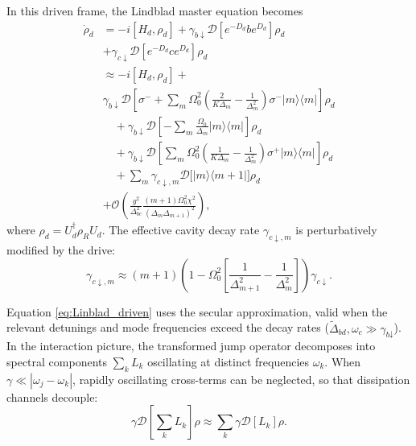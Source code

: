 In this driven frame, the Lindblad master equation becomes
\begin{align}
\label{eq:Linblad_driven}
    \dot{\rho}_d &= -i[H_d, \rho_d] + \gamma_{b\downarrow} \mathcal{D}\left[ e^{-D_d} b e^{D_d} \right] \rho_d \nonumber \\
    &+ \gamma_{c\downarrow} \mathcal{D}\left[ e^{-D_d} c e^{D_d} \right] \rho_d \nonumber \\
    &\approx-i[H_d, \rho_d] +\nonumber \\
    &\gamma_{b\downarrow} \mathcal{D}\left[ \sigma^- + \sum_m \Omega_0^2 \left(\frac{2}{K\Delta_m} - \frac{1}{\Delta_m^2}\right) \sigma^- |m\rangle\langle m| \right] \rho_d \nonumber \\
    &\quad + \gamma_{b\downarrow} \mathcal{D}\left[ -\sum_m \frac{\Omega_0}{\Delta_m} |m\rangle\langle m| \right] \rho_d \nonumber \\
    &\quad + \gamma_{b\downarrow} \mathcal{D}\left[ \sum_m \Omega_0^2 \left(\frac{1}{K\Delta_m} - \frac{1}{\Delta_m^2}\right) \sigma^+ |m\rangle\langle m| \right] \rho_d \nonumber \\
    &\quad + \sum_m \gamma_{c\downarrow, m} \mathcal{D}\big[ |m\rangle\langle m+1| \big] \rho_d \nonumber  \\
    &+\mathcal{O}\left( \frac{g^2}{\Delta_{bc}^2} \frac{(m+1)\Omega_0^2 \chi^2}{(\Delta_m \Delta_{m+1})^2} \right),
\end{align}
where $\rho_d = U_d^\dagger \rho_R U_d$. The effective cavity decay rate $\gamma_{c\downarrow, m}$ is perturbatively modified by the drive:
\begin{equation}
    \gamma_{c\downarrow, m} \approx (m+1) \left( 1 - \Omega_0^2 \left[ \frac{1}{\Delta_{m+1}^2} - \frac{1}{\Delta_m^2} \right] \right) \gamma_{c\downarrow}.
\end{equation}

Equation \eqref{eq:Linblad_driven} uses the secular approximation, valid when the relevant detunings and mode frequencies exceed the decay rates ($\widetilde\Delta_\textit{bd}, \omega_c \gg \gamma_{\textit{b}\downarrow}$). In the interaction picture, the transformed jump operator decomposes into spectral components $\sum_k L_k$ oscillating at distinct frequencies $\omega_k$. When $\gamma \ll |\omega_j-\omega_k|$, rapidly oscillating cross-terms can be neglected, so that dissipation channels decouple:
\begin{equation}
\gamma \mathcal{D}\left[ \sum_k L_k \right] \rho \approx \sum_k \gamma \mathcal{D}[L_k] \rho.
\end{equation}

